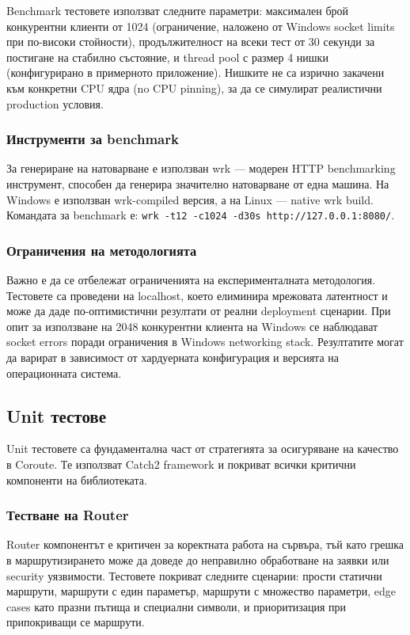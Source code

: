 Benchmark тестовете използват следните параметри: максимален брой конкурентни клиенти от 1024 (ограничение, наложено от Windows socket limits при по-високи стойности), продължителност на всеки тест от 30 секунди за постигане на стабилно състояние, и thread pool с размер 4 нишки (конфигурирано в примерното приложение). Нишките не са изрично закачени към конкретни CPU ядра (no CPU pinning), за да се симулират реалистични production условия.

\subsubsection{Инструменти за benchmark}

За генериране на натоварване е използван wrk \cite{wrk} --- модерен HTTP benchmarking инструмент, способен да генерира значително натоварване от една машина. На Windows е използван wrk-compiled версия, а на Linux --- native wrk build. Командата за benchmark е: \texttt{wrk -t12 -c1024 -d30s http://127.0.0.1:8080/}.

\subsubsection{Ограничения на методологията}

Важно е да се отбележат ограниченията на експерименталната методология. Тестовете са проведени на localhost, което елиминира мрежовата латентност и може да даде по-оптимистични резултати от реални deployment сценарии. При опит за използване на 2048 конкурентни клиента на Windows се наблюдават socket errors поради ограничения в Windows networking stack. Резултатите могат да варират в зависимост от хардуерната конфигурация и версията на операционната система.

\subsection{Unit тестове}

Unit тестовете са фундаментална част от стратегията за осигуряване на качество в Coroute. Те използват Catch2 framework \cite{catch2} и покриват всички критични компоненти на библиотеката.

\subsubsection{Тестване на Router}

Router компонентът е критичен за коректната работа на сървъра, тъй като грешка в маршрутизирането може да доведе до неправилно обработване на заявки или security уязвимости. Тестовете покриват следните сценарии: прости статични маршрути, маршрути с един параметър, маршрути с множество параметри, edge cases като празни пътища и специални символи, и приоритизация при припокриващи се маршрути.

